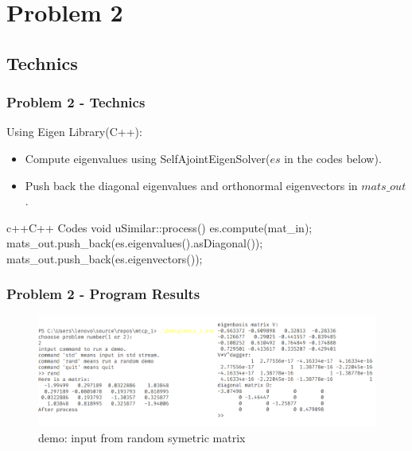 \section{Problem 2}
\subsection{Technics}

    \begin{frame}[fragile]
        \frametitle{Problem 2 - Technics}
        Using Eigen Library(C++):
        \begin{itemize}
            \item Compute eigenvalues using SelfAjointEigenSolver(\(es\) in the codes below).
            \item Push back the diagonal eigenvalues and orthonormal eigenvectors in \(mats\_out\).
        \end{itemize}

\begin{codeblock}{c++}{C++ Codes}
void uSimilar::process()
{
    es.compute(mat_in);
    mats_out.push_back(es.eigenvalues().asDiagonal());
    mats_out.push_back(es.eigenvectors());
}
        \end{codeblock}
    \end{frame}

    \begin{frame}
    \frametitle{Problem 2 - Program Results}
    
    \begin{figure}
        \centering
        \includegraphics[width = 1.7\textheight]{img/result2.png}
        \caption{demo: input from random symetric matrix}
    \end{figure}
\end{frame}
